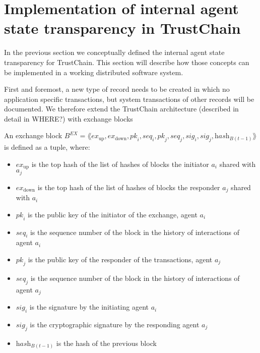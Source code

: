 \section{Implementation of internal agent state transparency in TrustChain}
\label{sec:implementation_state_transparency}
In the previous section we conceptually defined the internal agent state transparency for TrustChain.
This section will describe how those concepts can be implemented in a working distributed software
system. 

First and foremost, a new type of record needs to be created in which no application specific 
transactions, but system transactions of other records will be documented. We therefore extend the
TrustChain architecture (described in detail in {\color{red} WHERE?}) with exchange blocks 

\begin{defn}
    An exchange block $B^{EX} = \lAngle \textit{ex}_{\text{up}}, \textit{ex}_{\text{down}}, \textit{pk}_i, \textit{seq}_i, \textit{pk}_j, \textit{seq}_j, \textit{sig}_i, \textit{sig}_j, \textit{hash}_{B(t-1)} \rAngle$ is defined as a tuple, where:
    
    \begin{itemize}
        \item $\textit{ex}_{\text{up}}$ is the top hash of the list of hashes of blocks the initiator $a_i$ shared with $a_j$
        \item $\textit{ex}_{\text{down}}$ is the top hash of the list of hashes of blocks the responder $a_j$ shared with $a_i$
        \item $\textit{pk}_i$ is the public key of the initiator of the exchange, agent $a_i$
        \item $\textit{seq}_i$ is the sequence number of the block in the history of interactions of agent $a_i$
        \item $\textit{pk}_j$ is the public key of the responder of the transactions, agent $a_j$
        \item $\textit{seq}_j$ is the sequence number of the block in the history of interactions of agent $a_j$
        \item $\textit{sig}_i$ is the signature by the initiating agent $a_i$
        \item $\textit{sig}_j$ is the cryptographic signature by the responding agent $a_j$
        \item $\textit{hash}_{B(t-1)}$ is the hash of the previous block
    \end{itemize}
\end{defn}

